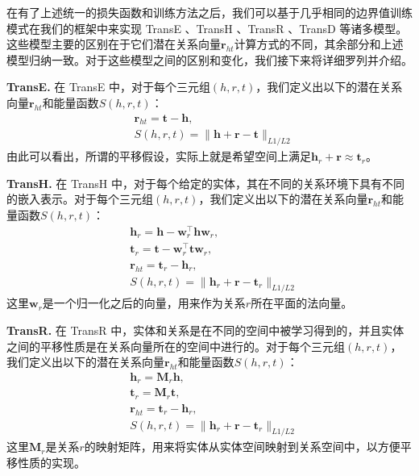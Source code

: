 在有了上述统一的损失函数和训练方法之后，我们可以基于几乎相同的边界值训练模式在我们的框架中来实现 TransE \cite{bordes2013translating}、TransH \cite{wang2014transh}、TransR \cite{lin2015learning}、TransD \cite{ji2015knowledge} 等诸多模型。这些模型主要的区别在于它们潜在关系向量$\textbf{r}_{ht}$计算方式的不同，其余部分和上述模型归纳一致。对于这些模型之间的区别和变化，我们接下来将详细罗列并介绍。

\textbf{TransE.} 在 TransE 中，对于每个三元组$(h, r, t)$，我们定义出以下的潜在关系向量$\textbf{r}_{ht}$和能量函数$S(h,r,t)$：
\begin{align}
&\textbf{r}_{ht} = \textbf{t} - \textbf{h},  \\\nonumber
&S(h, r, t) = \lVert \textbf{h} + \textbf{r} - \textbf{t} \rVert_{L1/L2}
\end{align}
由此可以看出，所谓的平移假设，实际上就是希望空间上满足$\mathbf{h}_r + \mathbf{r} \approx \mathbf{t}_r$。

\textbf{TransH.} 在 TransH 中，对于每个给定的实体，其在不同的关系环境下具有不同的嵌入表示。对于每个三元组$(h, r, t)$，我们定义出以下的潜在关系向量$\textbf{r}_{ht}$和能量函数$S(h,r,t)$：
\begin{align}
&\textbf{h}_r = \textbf{h} - \textbf{w}_r^{\top} \textbf{h} \textbf{w}_r, \\\nonumber
&\textbf{t}_r = \textbf{t} - \textbf{w}_r^{\top} \textbf{t} \textbf{w}_r, \\\nonumber
&\textbf{r}_{ht} = \textbf{t}_r - \textbf{h}_r,  \\\nonumber
&S(h, r, t) = \lVert \textbf{h}_r + \textbf{r} - \textbf{t}_r \rVert_{L1/L2}
\end{align}
这里$\textbf{w}_r$是一个归一化之后的向量，用来作为关系$r$所在平面的法向量。

\textbf{TransR.} 在 TransR 中，实体和关系是在不同的空间中被学习得到的，并且实体之间的平移性质是在关系向量所在的空间中进行的。对于每个三元组$(h, r, t)$，我们定义出以下的潜在关系向量$\textbf{r}_{ht}$和能量函数$S(h,r,t)$：
\begin{align}
& \textbf{h}_r = \textbf{M}_r \textbf{h} , \\\nonumber 
& \textbf{t}_r = \textbf{M}_r \textbf{t} , \\\nonumber
& \textbf{r}_{ht} = \textbf{t}_r - \textbf{h}_r,  \\\nonumber
& S(h, r, t) = \lVert \textbf{h}_r + \textbf{r} - \textbf{t}_r \rVert_{L1/L2}
\end{align}
这里$\textbf{M}_r$是关系$r$的映射矩阵，用来将实体从实体空间映射到关系空间中，以方便平移性质的实现。

